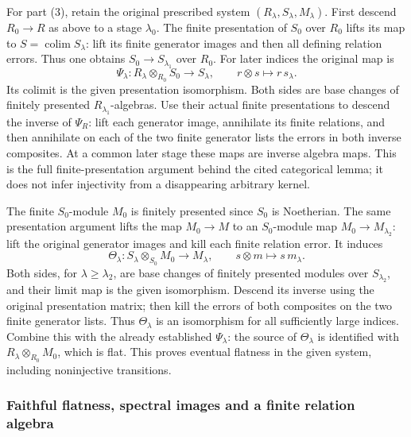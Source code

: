For part (3), retain the original prescribed system \((R_\lambda,S_\lambda,M_\lambda)\). First descend \(R_0\to R\) as above to a stage \(\lambda_0\). The finite presentation of \(S_0\) over \(R_0\) lifts its map to \(S=\operatorname{colim}S_\lambda\): lift its finite generator images and then all defining relation errors. Thus one obtains \(S_0\to S_{\lambda_1}\) over \(R_0\). For later indices the original map is \[
 \Psi_\lambda:R_\lambda\otimes_{R_0}S_0\longrightarrow S_\lambda,
 \qquad r\otimes s\longmapsto r\,s_\lambda.
\] Its colimit is the given presentation isomorphism. Both sides are base changes of finitely presented \(R_{\lambda_1}\)-algebras. Use their actual finite presentations to descend the inverse of \(\Psi_R\): lift each generator image, annihilate its finite relations, and then annihilate on each of the two finite generator lists the errors in both inverse composites. At a common later stage these maps are inverse algebra maps. This is the full finite-presentation argument behind the cited categorical lemma; it does not infer injectivity from a disappearing arbitrary kernel.

The finite \(S_0\)-module \(M_0\) is finitely presented since \(S_0\) is Noetherian. The same presentation argument lifts the map \(M_0\to M\) to an \(S_0\)-module map \(M_0\to M_{\lambda_2}\): lift the original generator images and kill each finite relation error. It induces \[
 \Theta_\lambda:S_\lambda\otimes_{S_0}M_0\longrightarrow M_\lambda,
 \qquad s\otimes m\longmapsto s\,m_\lambda.
\] Both sides, for \(\lambda\ge\lambda_2\), are base changes of finitely presented modules over \(S_{\lambda_2}\), and their limit map is the given isomorphism. Descend its inverse using the original presentation matrix; then kill the errors of both composites on the two finite generator lists. Thus \(\Theta_\lambda\) is an isomorphism for all sufficiently large indices. Combine this with the already established \(\Psi_\lambda\): the source of \(\Theta_\lambda\) is identified with \(R_\lambda\otimes_{R_0}M_0\), which is flat. This proves eventual flatness in the given system, including noninjective transitions.

\subsubsection{Faithful flatness, spectral images and a finite relation algebra}\label{algebra-proof-072-faithful-flatness-spectral-images-and-a-finite-relation-algebra}

